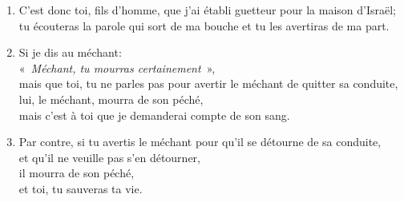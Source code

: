 \documentclass[12pt,a4paper,titlepage]{article}
\def \pslabelsep{0.2em} %
\def \psleftmargin{0em} %
\begin{document}
\begin{enumerate}[leftmargin=\psleftmargin, labelsep = \pslabelsep, label={\arabic*}, font=\color{\pscolor}\small\textsuperscript, parsep=0em, itemsep=0em, topsep=0em ]
\item C’est donc toi, fils d’homme, que j’ai établi guetteur pour la maison d’Israël;\\ tu écouteras la parole qui sort de ma bouche et tu les avertiras de ma part.
\item Si je dis au méchant: \\ \decalage «~\textit{Méchant, tu mourras certainement}~»,\\ mais que toi, tu ne parles pas pour avertir le méchant de quitter sa conduite, \\ lui, le méchant, mourra de son péché, \\ mais c’est à toi que je demanderai compte de son sang. 
\item Par contre, si tu avertis le méchant pour qu’il se détourne de sa conduite, \\ et qu’il ne veuille pas s’en détourner, \\ il mourra de son péché, \\ et toi, tu sauveras ta vie. \parSpace


\end{enumerate}
\end{document}
